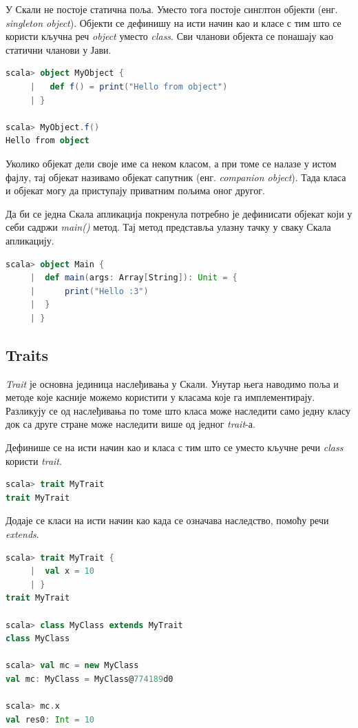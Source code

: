 \documentclass[12pt,oneside]{memoir}
\begin{document}
У Скали не постоје статична поља. Уместо тога постоје синглтон објекти (енг. \textit{singleton object}). Објекти се дефинишу на исти начин као и класе с тим што се користи кључна реч \textit{object} уместо \textit{class}. Сви чланови објекта се понашају као статични чланови у Јави. \cite{scala_prog}

\begin{lstlisting}[language=Scala]
scala> object MyObject {
     |   def f() = print("Hello from object")
     | }

scala> MyObject.f()
Hello from object
\end{lstlisting}

Уколико објекат дели своје име са неком класом, а при томе се налазе у истом фајлу, тај објекат називамо објекат сапутник (енг. \textit{companion object}). Тада класа и објекат могу да приступају приватним пољима оног другог.

Да би се једна Скала апликација покренула потребно је дефинисати објекат који у себи садржи \textit{main()} метод. Тај метод представља улазну тачку у сваку Скала апликацију.

\begin{lstlisting}[language=Scala]
scala> object Main {
     |  def main(args: Array[String]): Unit = {
     |      print("Hello :3")
     | 	}
     | }
\end{lstlisting}

\subsection{Traits}
\label{subsec:scala_traits}

\textit{Trait} је основна јединица наслеђивања у Скали. Унутар њега наводимо поља и методе које касније можемо користити у класама које га имплементирају. Разликују се од наслеђивања по томе што класа може наследити само једну класу док са друге стране може наследити више од једног \textit{trait}-а. \cite{scala_prog}

Дефинише се на исти начин као и класа с тим што се уместо кључне речи \textit{class} користи \textit{trait}.

\begin{lstlisting}[language=Scala]
scala> trait MyTrait
trait MyTrait
\end{lstlisting}

Додаје се класи на исти начин као када се означава наследство, помоћу речи \textit{extends}. 

\begin{lstlisting}[language=Scala]
scala> trait MyTrait {
     |  val x = 10
     | }
trait MyTrait

scala> class MyClass extends MyTrait
class MyClass

scala> val mc = new MyClass
val mc: MyClass = MyClass@774189d0

scala> mc.x
val res0: Int = 10
\end{lstlisting}
\end{document}
